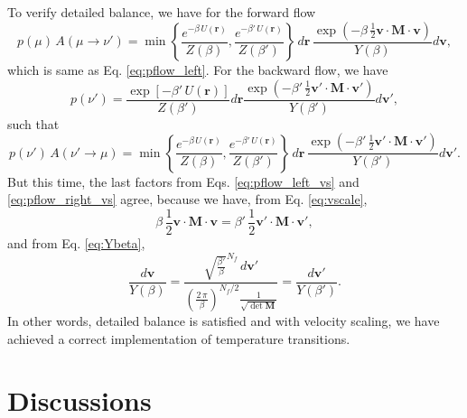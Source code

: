 \documentclass[11pt]{article}
\begin{document}
To verify detailed balance,
we have for the forward flow
%
\begin{equation}
  p(\mu) \, A(\mu \to \nu')
  =
  \min\left\{
    \frac{
      e^{ -\beta \, U(\mathbf r) }
    }
    {
      Z(\beta)
    }
    ,
    \frac{
      e^{ -\beta' \, U(\mathbf r) }
    }
    {
      Z(\beta')
    }
  \right\}
  \, d \mathbf r \,
  \frac{
    \exp\left(
      -\beta \, \frac{1}{2} \mathbf v \cdot \mathbf M \cdot \mathbf v
    \right)
  }
  {
    Y(\beta)
  }
  d \mathbf v
  ,
\label{eq:pflow_left_vs}
\end{equation}
%
which is same as Eq. \eqref{eq:pflow_left}.
%
For the backward flow,
we have
$$
  p(\nu')
  =
  \frac{
    \exp\left[
       -\beta' \, U(\mathbf r)
    \right]
  }
  {
    Z(\beta')
  }
  d \mathbf r
  \frac{
    \exp\left(
      -\beta' \, \frac{1}{2} \mathbf v' \cdot \mathbf M \cdot \mathbf v'
    \right)
  }
  {
    Y(\beta')
  }
  d \mathbf v'
  ,
$$
such that
%
\begin{equation}
  p(\nu') \, A(\nu' \to \mu)
  =
  \min\left\{
    \frac{
      e^{ -\beta \, U(\mathbf r) }
    }
    {
      Z(\beta)
    }
    ,
    \frac{
      e^{ -\beta' \, U(\mathbf r) }
    }
    {
      Z(\beta')
    }
  \right\}
  \, d \mathbf r \,
  \frac{
    \exp\left(
      -\beta' \, \frac{1}{2} \mathbf v' \cdot \mathbf M \cdot \mathbf v'
    \right)
  }
  {
    Y(\beta')
  }
  d \mathbf v'
  .
\label{eq:pflow_right_vs}
\end{equation}
%
But this time,
the last factors from Eqs. \eqref{eq:pflow_left_vs}
and \eqref{eq:pflow_right_vs} agree,
because we have, from
Eq. \eqref{eq:vscale},
%
$$
  \beta \, \frac{1}{2} \mathbf v \cdot \mathbf M \cdot \mathbf v
  =
  \beta' \, \frac{1}{2} \mathbf v' \cdot \mathbf M \cdot \mathbf v'
  ,
$$
%
and from Eq. \eqref{eq:Ybeta},
%
$$
  \frac{ d \mathbf v } { Y(\beta) }
  =
  \frac{
    \sqrt { \frac { \beta' } { \beta } }^{ N_f }
    \, d \mathbf v'
  }
  {
    \left(
      \frac{ 2 \, \pi } { \beta }
    \right)^{ N_f / 2 }
    \frac{ 1 } { \sqrt { \det \mathbf M } }
  }
  =
  \frac{ d \mathbf v' } { Y(\beta') }
  .
$$
%
In other words, detailed balance is satisfied
and with velocity scaling,
we have achieved a correct implementation of temperature transitions.


\section{Discussions}
\end{document}

